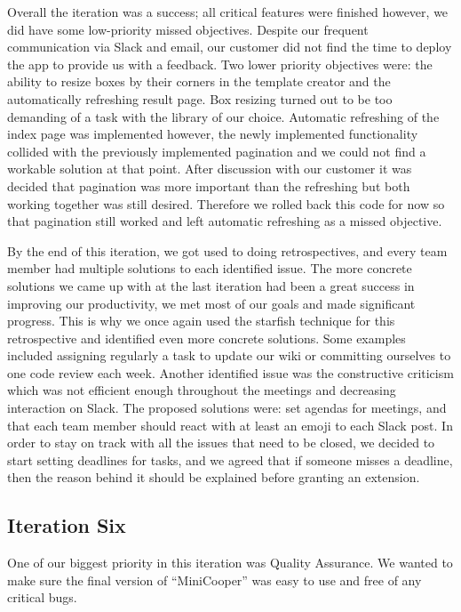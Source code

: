 \documentclass{l3proj}
\begin{document}
Overall the iteration was a success; all critical features were finished however, we did have some low-priority missed objectives. Despite our frequent communication via Slack and email, our customer did not find the time to deploy the app to provide us with a feedback. Two lower priority objectives were: the ability to resize boxes by their corners in the template creator and the automatically refreshing result page. Box resizing turned out to be too demanding of a task with the library of our choice. Automatic refreshing of the index page was implemented however, the newly implemented functionality collided with the previously implemented pagination and we could not find a workable solution at that point. After discussion with our customer it was decided that pagination was more important than the refreshing but both working together was still desired. Therefore we rolled back this code for now so that pagination still worked and left automatic refreshing as a missed objective. 

By the end of this iteration, we got used to doing retrospectives, and every team member had multiple solutions to each identified issue. The more concrete solutions we came up with at the last iteration had been a great success in improving our productivity, we met most of our goals and made significant progress. This is why we once again used the starfish technique for this retrospective and identified  even more concrete solutions. Some examples included assigning regularly a task to update our wiki or committing ourselves to one code review each week. Another identified issue was the constructive criticism which was not efficient enough throughout the meetings and decreasing interaction on Slack. The proposed solutions were: set agendas for meetings, and that each team member should react with at least an emoji to each Slack post.
In order to stay on track with all the issues that need to be closed, we decided to start setting deadlines for tasks, and we agreed that if someone misses a deadline, then the reason behind it should be explained before granting an extension.

\subsection{Iteration Six}

One of our biggest priority in this iteration was Quality Assurance. We wanted to make sure the final version of ``MiniCooper'' was easy to use and free of any critical bugs.
\end{document}
